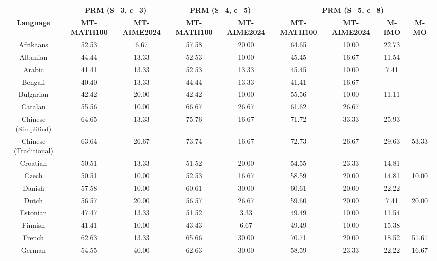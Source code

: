 \begin{table*}[]
\centering
\fontsize{6}{9} \selectfont
\begin{tabular}{c|cc|cc|cccl}
\toprule
 & \multicolumn{2}{c|}{\textbf{PRM (S=3, c=3)}} & \multicolumn{2}{c|}{\textbf{PRM (S=4, c=5)}} & \multicolumn{4}{c}{\textbf{PRM (S=5, c=8)}} \\ \cmidrule{2-9}
\multirow{-2}{*}{\textbf{Language}} & \textbf{MT-MATH100} & \textbf{MT-AIME2024} & \textbf{MT-MATH100} & \textbf{MT-AIME2024} & \textbf{MT-MATH100} & \textbf{MT-AIME2024} & \textbf{M-IMO} & \multicolumn{1}{c}{\textbf{M-MO}} \\ \midrule
Afrikaans & 52.53 & 6.67 & 57.58 & 20.00 & 64.65 & 10.00 & 22.73 &  \\
Albanian & 44.44 & 13.33 & 52.53 & 10.00 & 45.45 & 16.67 & 11.54 &  \\
Arabic & 41.41 & 13.33 & 52.53 & 13.33 & 45.45 & 10.00 & 7.41 &  \\
Bengali & 40.40 & 13.33 & 44.44 & 13.33 & 41.41 & 16.67 & \multicolumn{1}{l}{} &  \\
Bulgarian & 42.42 & 20.00 & 42.42 & 10.00 & 55.56 & 10.00 & 11.11 &  \\
Catalan & 55.56 & 10.00 & 66.67 & 26.67 & 61.62 & 26.67 & \multicolumn{1}{l}{} &  \\
Chinese (Simplified) & 64.65 & 13.33 & 75.76 & 16.67 & 71.72 & 33.33 & 25.93 & \multicolumn{1}{c}{} \\
Chinese (Traditional) & 63.64 & 26.67 & 73.74 & 16.67 & 72.73 & 26.67 & 29.63 & \multicolumn{1}{c}{\multirow{-2}{*}{53.33}} \\
Croatian & 50.51 & 13.33 & 51.52 & 20.00 & 54.55 & 23.33 & 14.81 &  \\
Czech & 50.51 & 10.00 & 52.53 & 16.67 & 58.59 & 20.00 & 14.81 & \multicolumn{1}{c}{10.00} \\
Danish & 57.58 & 10.00 & 60.61 & 30.00 & 60.61 & 20.00 & 22.22 &  \\
Dutch & 56.57 & 20.00 & 56.57 & 26.67 & 59.60 & 20.00 & 7.41 & \multicolumn{1}{c}{20.00} \\
Estonian & 47.47 & 13.33 & 51.52 & 3.33 & 49.49 & 10.00 & 11.54 &  \\
Finnish & 41.41 & 10.00 & 43.43 & 6.67 & 49.49 & 10.00 & 15.38 &  \\
French & 62.63 & 13.33 & 65.66 & 30.00 & 70.71 & 20.00 & 18.52 & \multicolumn{1}{c}{51.61} \\
German & 54.55 & 40.00 & 62.63 & 30.00 & 58.59 & 23.33 & 22.22 & \multicolumn{1}{c}{16.67} \\

\end{tabular}
\end{table*}
